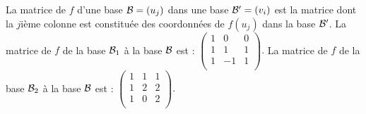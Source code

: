 {\begin{question}
\begin{answers}
\end{answers}
\vskip2mm
\begin{explanations} La matrice de $f$  d'une base $ {\cal {B}}=(u_j)$ dans une  base $ {\cal {B}}'=(v_i)$ est la matrice  dont la $j$ième colonne est constituée des coordonnées de  $f(u_j)$ dans la base $ {\cal {B}}'$. La matrice de $f$ de la base $ {\cal {B}}_1$ à la base  ${\cal {B}}$  est : $
\left(\begin{array}{rcc}
1&0&0\\
1&1&1\\
1&-1&1\\
\end{array}\right).$
\vskip0mm
La matrice de $f$ de la base $ {\cal {B}}_2$ à la base  ${\cal {B}}$  est : $
 \left(\begin{array}{rcc}
1&1&1\\
1&2&2\\
1&0&2\\
\end{array}\right).$
\end{explanations}
\end{question}
}

